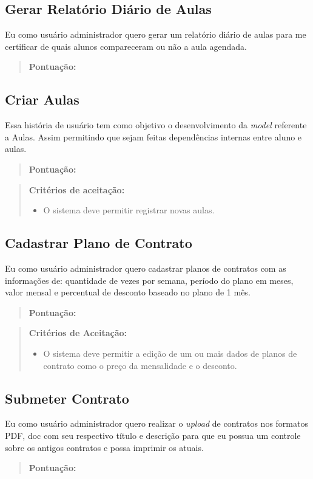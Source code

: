 \subsection[Gerar Relatório Diário de Aulas]{Gerar Relatório Diário de Aulas}
Eu como usuário administrador quero gerar um relatório diário de aulas para me
certificar de quais alunos compareceram ou não a aula agendada.
\begin{quote}
    \textbf{Pontuação:}
\end{quote}

\subsection[Criar Aulas]{Criar Aulas}
Essa história de usuário tem como objetivo o desenvolvimento da \textsl{model} referente
a Aulas. Assim permitindo que sejam feitas dependências internas entre aluno
e aulas.
\begin{quote}
    \textbf{Pontuação:}
\end{quote}
\begin{quote}
\textbf{Critérios de aceitação:}
    \begin{itemize}
        \item O sistema deve permitir registrar novas aulas.
    \end{itemize}
\end{quote}

\subsection[Cadastrar Plano de Contrato]{Cadastrar Plano de Contrato}
Eu como usuário administrador quero cadastrar planos de contratos com as
informações de: quantidade de vezes por semana, período do plano em meses,
valor mensal e percentual de desconto baseado no plano de 1 mês.
\begin{quote}
    \textbf{Pontuação:}
\end{quote}
\begin{quote}
\textbf{Critérios de Aceitação:}
    \begin{itemize}
        \item O sistema deve permitir a edição de um ou mais dados de planos de contrato
        como o preço da mensalidade e o desconto.
    \end{itemize}
\end{quote}

\subsection[Submeter Contrato]{Submeter Contrato}
Eu como usuário administrador quero realizar o \textsl{upload} de contratos nos formatos
PDF, doc com seu respectivo título e descrição para que eu possua um controle
sobre os antigos contratos e possa imprimir os atuais.
\begin{quote}
    \textbf{Pontuação:}
\end{quote}

